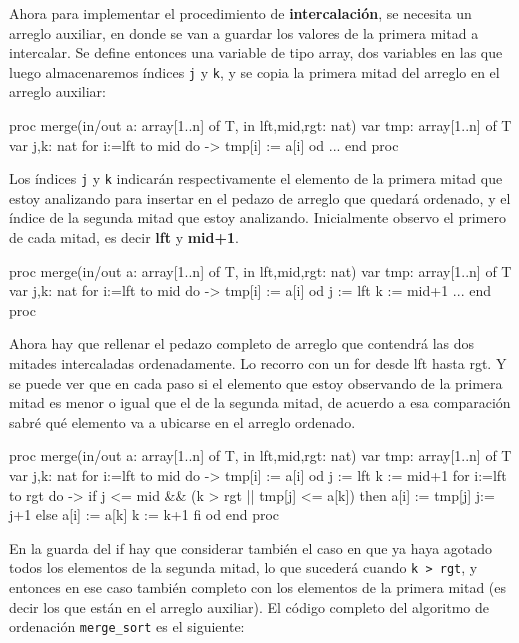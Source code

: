 Ahora para implementar el procedimiento de \textbf{intercalación}, se necesita un arreglo auxiliar, en donde se van a guardar los valores de la primera mitad a intercalar.
Se define entonces una variable de tipo array, dos variables en las que luego almacenaremos índices \texttt{j} y \texttt{k}, y se copia la primera mitad del arreglo en el arreglo auxiliar:
\begin{pascallike}
proc merge(in/out a: array[1..n] of T, in lft,mid,rgt: nat)
    var tmp: array[1..n] of T
    var j,k: nat
    for i:=lft to mid do ->
        tmp[i] := a[i] 
    od
    ...
end proc
\end{pascallike}
Los índices \texttt{j} y \texttt{k} indicarán respectivamente el elemento de la primera mitad que estoy analizando para insertar en el pedazo de arreglo que quedará ordenado, y el índice de la segunda mitad que estoy analizando. Inicialmente observo el primero de cada mitad, es decir \textbf{lft} y \textbf{mid+1}.
\begin{pascallike}
proc merge(in/out a: array[1..n] of T, in lft,mid,rgt: nat)
    var tmp: array[1..n] of T
    var j,k: nat
    for i:=lft to mid do ->
        tmp[i] := a[i] 
    od
    j := lft
    k := mid+1
    ...
end proc
\end{pascallike}
Ahora hay que rellenar el pedazo completo de arreglo que contendrá las dos mitades intercaladas ordenadamente. Lo recorro con un for desde lft hasta rgt. Y se puede ver que en cada paso si el elemento que estoy observando de la primera mitad es menor o igual que el de la segunda mitad, de acuerdo a esa comparación sabré qué elemento va a ubicarse en el arreglo ordenado.
\begin{pascallike}
proc merge(in/out a: array[1..n] of T, in lft,mid,rgt: nat)
    var tmp: array[1..n] of T
    var j,k: nat
    for i:=lft to mid do ->
        tmp[i] := a[i] 
    od
    j := lft
    k := mid+1
    for i:=lft to rgt do ->
        if j <= mid && (k > rgt || tmp[j] <= a[k])
            then a[i] := tmp[j]
                j:= j+1
            else a[i] := a[k]
                k := k+1
        fi
    od
end proc
\end{pascallike}
En la guarda del if hay que considerar también el caso en que ya haya agotado todos los elementos de la segunda mitad, lo que sucederá cuando \texttt{k > rgt}, y entonces en ese caso también completo con los elementos de la primera mitad (es decir los que están en el arreglo auxiliar).
El código completo del algoritmo de ordenación \texttt{merge\_sort} es el siguiente:
